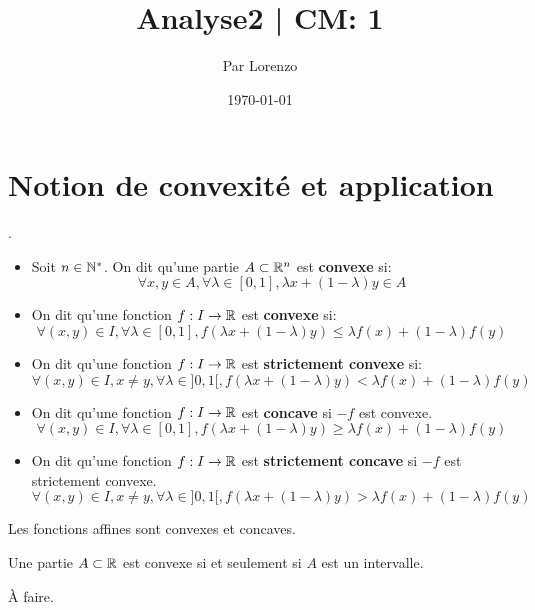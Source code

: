 \documentclass[a4paper, 12pt]{article}
\title{Analyse2 | CM: 1}
\author{Par Lorenzo}
\date{\today}
\begin{document}
\maketitle

\section{Notion de convexité et application}

\begin{definition}.
    \begin{itemize}
        \item Soit $n \in \mathbb{N}^*$. On dit qu'une partie $A \subset \mathbb{R}^n$ est \textbf{convexe} si:
        $$
        \forall x, y \in A, \forall \lambda \in [0, 1], \lambda x + (1 - \lambda)y \in A
        $$
        \item On dit qu'une fonction $f: I \rightarrow \mathbb{R}$ est \textbf{convexe} si:
        $$
        \forall (x, y) \in I, \forall \lambda \in [0, 1], f(\lambda x + (1 - \lambda)y) \leq \lambda f(x) + (1 - \lambda)f(y)
        $$
        \item On dit qu'une fonction $f: I \rightarrow \mathbb{R}$ est \textbf{strictement convexe} si:
        $$
        \forall (x, y) \in I, x \neq y, \forall \lambda \in ]0, 1[, f(\lambda x + (1 - \lambda)y) < \lambda f(x) + (1 - \lambda)f(y)
        $$
        \item On dit qu'une fonction $f: I \rightarrow \mathbb{R}$ est \textbf{concave} si $-f$ est convexe.
        $$
        \forall (x, y) \in I, \forall \lambda \in [0, 1], f(\lambda x + (1 - \lambda)y) \geq \lambda f(x) + (1 - \lambda)f(y)
        $$
        \item On dit qu'une fonction $f: I \rightarrow \mathbb{R}$ est \textbf{strictement concave} si $-f$ est strictement convexe.
        $$
        \forall (x, y) \in I, x \neq y, \forall \lambda \in ]0, 1[, f(\lambda x + (1 - \lambda)y) > \lambda f(x) + (1 - \lambda)f(y)
        $$
    \end{itemize}
\end{definition}

\begin{remark}
    Les fonctions affines sont convexes et concaves.
\end{remark}

\begin{proposition}
    Une partie $A \subset \mathbb{R}$ est convexe si et seulement si $A$ est un intervalle.
\end{proposition}

\begin{demonstration}
    À faire.
\end{demonstration}
\end{document}
